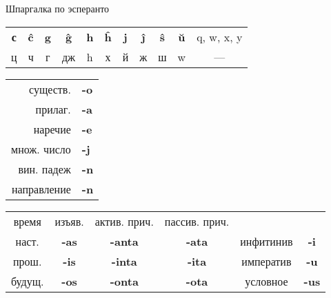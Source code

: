 \documentclass{article}
\def\b#1{\textbf{#1}}
\begin{document}
{\Huge Шпаргалка по эсперанто}
\begin{tabular}{ccccccccccc}
\b{с} & \b{ĉ} & \b{g} & \b{ĝ} & \b{h} & \b{ĥ} & \b{j} & \b{ĵ} & \b{ŝ} & \b{ŭ} & q, w, x, y \\
ц & ч & г & дж & h & х & й & ж & ш & w & --- \\
\end{tabular}

\begin{tabular}{r>{\bfseries}l}
существ. & -o \\
прилаг. & -a \\
наречие & -e \\
множ. число & -j \\
вин. падеж & -n \\
направление & -n \\
\end{tabular}
\begin{tabular}{cccccc}
время & изъяв. & актив. прич. & пассив. прич. & ~ & ~ \\
наст. & \b{-as} & \b{-anta} & \b{-ata} & инфитинив & \b{-i} \\
прош. & \b{-is} & \b{-inta} & \b{-ita} & императив & \b{-u} \\
будущ. & \b{-os} & \b{-onta} & \b{-ota} & условное & \b{-us} \\
\end{tabular}
\end{document}
